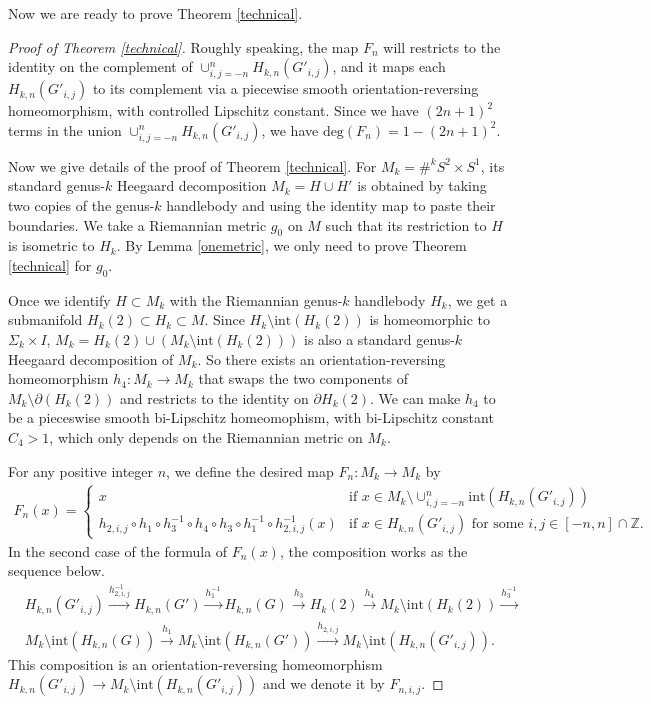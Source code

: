\documentclass{amsart}
\begin{document}
Now we are ready to prove Theorem \ref{technical}. 
\begin{proof}[Proof of Theorem \ref{technical}]
Roughly speaking, the map $F_n$ will restricts to the identity on the complement of $\cup_{i,j=-n}^nH_{k,n}(G'_{i,j})$, and it maps each $H_{k,n}(G'_{i,j})$ to its complement via a piecewise smooth orientation-reversing homeomorphism, with controlled Lipschitz constant. Since we have $(2n+1)^2$ terms in the union $\cup_{i,j=-n}^nH_{k,n}(G'_{i,j})$, we have $\text{deg}(F_n)=1-(2n+1)^2$.

Now we give details of the proof of Theorem \ref{technical}.
For $M_k=\#^kS^2\times S^1$, its standard genus-$k$ Heegaard decomposition $M_k=H\cup H'$ is obtained by taking two copies of the genus-$k$ handlebody and using the identity map to paste their boundaries. We take a Riemannian metric $g_0$ on $M$ such that its restriction to $H$ is isometric to $H_k$. By Lemma \ref{onemetric}, we only need to prove Theorem \ref{technical} for $g_0$.

Once we identify $H\subset M_k$ with the Riemannian genus-$k$ handlebody $H_k$, we get a submanifold $H_k(2)\subset H_k\subset M$. Since $H_k\setminus \text{int}(H_k(2))$ is homeomorphic to $\Sigma_k\times I$, $M_k=H_k(2)\cup (M_k\setminus \text{int}(H_k(2)))$ is also a standard genus-$k$ Heegaard decomposition of $M_k$. So there exists an orientation-reversing homeomorphism $h_4: M_k\to M_k$ that swaps the two components of $M_k\setminus \partial (H_k(2))$ and restricts to the identity on $\partial H_k(2)$. We can make $h_4$ to be a pieceswise smooth bi-Lipschitz homeomophism, with bi-Lipschitz constant $C_4>1$, which only depends on the Riemannian metric on $M_k$.

For any positive integer $n$, we define the desired map $F_n:M_k\to M_k$ by
\begin{equation*}
\begin{aligned}
F_n(x)=\begin{cases}
x &\text{if\ } x\in M_k\setminus \cup_{i,j=-n}^n\text{int}(H_{k,n}(G'_{i,j}))\\
h_{2,i,j}\circ h_1\circ h_3^{-1} \circ h_4 \circ h_3 \circ h_1^{-1}\circ h_{2,i,j}^{-1}(x) & \text{if\ } x\in H_{k,n}(G'_{i,j}) \text{\ for\ some\ }i,j\in [-n,n]\cap \mathbb{Z}.
\end{cases}
\end{aligned}
\end{equation*}
In the second case of the formula of $F_n(x)$, the composition works as the sequence below.
\begin{equation*}
\begin{aligned}
&H_{k,n}(G'_{i,j})\xrightarrow{h_{2,i,j}^{-1}} H_{k,n}(G')\xrightarrow{h_1^{-1}}H_{k,n}(G)\xrightarrow{h_3}H_k(2)\xrightarrow{h_4}M_k\setminus \text{int}(H_k(2))\xrightarrow{h_3^{-1}}\\
& M_k\setminus \text{int}(H_{k,n}(G))\xrightarrow{h_1} M_k\setminus \text{int}(H_{k,n}(G'))\xrightarrow{h_{2,i,j}}M_k\setminus \text{int}(H_{k,n}(G'_{i,j})).
\end{aligned}
\end{equation*}
This composition is an orientation-reversing homeomorphism $H_{k,n}(G'_{i,j})\to M_k\setminus \text{int}(H_{k,n}(G'_{i,j}))$ and we denote it by $F_{n,i,j}$.


\end{proof}
\end{document}
